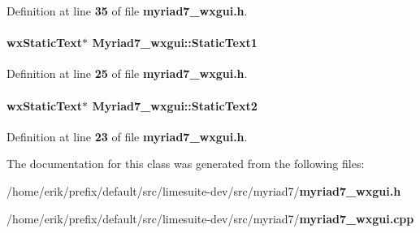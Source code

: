 Definition at line {\bf 35} of file {\bf myriad7\+\_\+wxgui.\+h}.

\paragraph[{Static\+Text1}]{\setlength{\rightskip}{0pt plus 5cm}wx\+Static\+Text$\ast$ Myriad7\+\_\+wxgui\+::\+Static\+Text1}\label{classMyriad7__wxgui_acb87b2e215cc5ffe3aa0c7e1dce0ff5a}


Definition at line {\bf 25} of file {\bf myriad7\+\_\+wxgui.\+h}.

\paragraph[{Static\+Text2}]{\setlength{\rightskip}{0pt plus 5cm}wx\+Static\+Text$\ast$ Myriad7\+\_\+wxgui\+::\+Static\+Text2}\label{classMyriad7__wxgui_ad4c19b8c7f3e3ed5d72e781fdf216a5d}


Definition at line {\bf 23} of file {\bf myriad7\+\_\+wxgui.\+h}.



The documentation for this class was generated from the following files\+:\begin{DoxyCompactItemize}
\item 
/home/erik/prefix/default/src/limesuite-\/dev/src/myriad7/{\bf myriad7\+\_\+wxgui.\+h}\item 
/home/erik/prefix/default/src/limesuite-\/dev/src/myriad7/{\bf myriad7\+\_\+wxgui.\+cpp}\end{DoxyCompactItemize}
